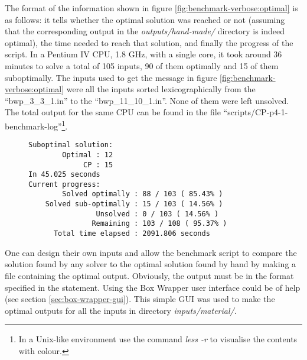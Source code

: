 The format of the information shown in figure \ref{fig:benchmark-verbose:optimal}
is as follows: it tells whether the optimal solution was reached or not (assuming
that the corresponding output in the \textit{outputs/hand-made/} directory is indeed
optimal), the time needed to reach that solution, and finally the progress of the
script. In a Pentium IV CPU, 1.8 GHz, with a single core, it took around 36 minutes
to solve a total of 105 inputs, 90 of them optimally and 15 of them suboptimally.
The inputs used to get the message in figure \ref{fig:benchmark-verbose:optimal} were
all the inputs sorted lexicographically from the ``bwp\_3\_3\_1.in'' to the
``bwp\_11\_10\_1.in''. None of them were left unsolved. The total output for the
same CPU can be found in the file ``scripts/CP-p4-1-benchmark-log''\footnote{ In a
Unix-like environment use the command \textit{less -r} to visualise the contents with colour.}.

\begin{figure}[H]
\centering
{\scriptsize
\begin{BVerbatim}
Suboptimal solution:
        Optimal : 12
             CP : 15
In 45.025 seconds
Current progress:
        Solved optimally : 88 / 103 ( 85.43%
    Solved sub-optimally : 15 / 103 ( 14.56%
                Unsolved : 0 / 103 ( 14.56%
               Remaining : 103 / 108 ( 95.37%
      Total time elapsed : 2091.806 seconds
\end{BVerbatim}
}
\label{fig:benchmark-verbose:suboptimal}
\end{figure}

One can design their own inputs and allow the benchmark script to compare
the solution found by any solver to the optimal solution found by hand by
making a file containing the optimal output. Obviously, the output must
be in the format specified in the statement. Using the Box Wrapper user
interface could be of help (see section \ref{sec:box-wrapper-gui}).
This simple GUI was used to make the optimal outputs for all the inputs
in directory \textit{inputs/material/}.

\hfill

